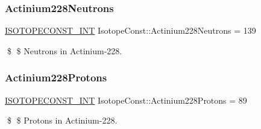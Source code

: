 \subsubsection{\texorpdfstring{Actinium228\+Neutrons}{Actinium228Neutrons}}
{\footnotesize\ttfamily \mbox{\hyperlink{group___isotope_const-_macros_ga5f18360b3e99483a35c32d789e62621c}{I\+S\+O\+T\+O\+P\+E\+C\+O\+N\+S\+T\+\_\+\+I\+NT}} Isotope\+Const\+::\+Actinium228\+Neutrons = 139}

\$ \$ Neutrons in Actinium-\/228. \mbox{\label{group___isotope_const-_actinium-_ac228_ga66de5f9ab4d0022dac1816dbef77700d}} 
\subsubsection{\texorpdfstring{Actinium228\+Protons}{Actinium228Protons}}
{\footnotesize\ttfamily \mbox{\hyperlink{group___isotope_const-_macros_ga5f18360b3e99483a35c32d789e62621c}{I\+S\+O\+T\+O\+P\+E\+C\+O\+N\+S\+T\+\_\+\+I\+NT}} Isotope\+Const\+::\+Actinium228\+Protons = 89}

\$ \$ Protons in Actinium-\/228. 